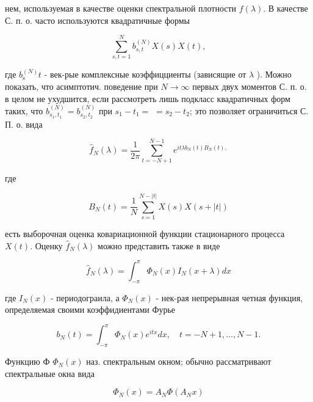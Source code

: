 \documentclass[10pt]{article}
\begin{document}
нем, используемая в качестве оценки спектральной плотности $f(\lambda)$. В качестве С. п. о. часто используются квадратичные формы



\[

\sum_{s, t=1}^{N} b_{s, t}^{(N)} X(s) X(t),

\]



где $b_{\mathrm{s}}^{(N)} t$ - век-рые комплексные коэффицциенты (зависящие от $\lambda$ ). Можно показать, что асимптотич. поведение при $N \rightarrow \infty$ первых двух моментов С. п. о. в целом не ухудшится, если рассмотреть лишь подкласс квадратичных форм таких, что $b_{s_{1}, t_{1}}^{(N)}=b_{s_{2}, t_{2}}^{(N)}$ при $s_{1}-t_{1}=$ $=s_{2}-t_{2}$; это позволяет ограничиться С. П. о. вида



\[

\hat{f}_{N}(\lambda)=\frac{1}{2 \pi} \sum_{t=-N+1}^{N-1} e^{i t \lambda b_{N}(t) B_{N}(t),}

\]



где



\[

B_{N}(t)=\frac{1}{N} \sum_{s=1}^{N-|t|} X(s) X(s+|t|)

\]



есть выборочная оценка ковариационной функции стационарного процесса $X(t)$. Оценку $\hat{f}_{N}(\lambda)$ можно представить также в виде



\[

\hat{f}_{N}(\lambda)=\int_{-\pi}^{\pi} \Phi_{N}(x) I_{N}(x+\lambda) d x

\]



где $I_{N}(x)$ - периодограила, а $\Phi_{N}(x)$ - нек-рая непрерывная четная функция, определяемая своими коэффидиентами Фурье



\[

b_{N}(t)=\int_{-\pi}^{\pi} \Phi_{N}(x) e^{i t x} d x, \quad t=-N+1, \ldots, N-1 .

\]



Функцию Ф $\Phi_{N}(x)$ наз. спектральным окном; обычно рассматривают спектральные окна вида



\[

\Phi_{N}(x)=A_{N} \Phi\left(A_{N} x\right)

\]
\end{document}
